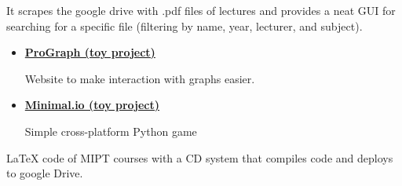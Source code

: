 

{\href{https://github.com/mipt-ltc/mipt-ltc.github.io}
{}}
It scrapes the google drive with .pdf files of lectures and provides a neat GUI for searching for a specific file (filtering by name, year, lecturer, and subject).
    
\divider

{\href{https://github.com/Unicorn-Dev}{}}
\begin{itemize}
    \item \href{https://github.com/Unicorn-Dev/ProGraph}
        {\textbf{ProGraph (toy project)}}

    Website to make interaction with graphs easier.

    \item \href{https://github.com/Unicorn-Dev/Minimal.io}
        {\textbf{Minimal.io (toy project)}}

    Simple cross-platform Python game

\end{itemize}
\divider


{\href{https://github.com/MIPT-Group/Lectures_Tex_Club}
{}}
LaTeX code of MIPT courses with a CD system that compiles code and deploys to google Drive.
